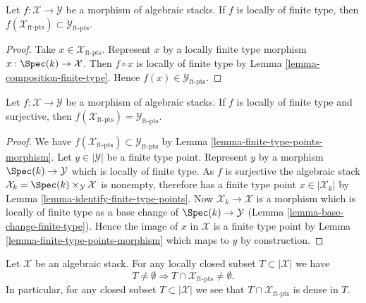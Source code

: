\begin{lemma}
\label{lemma-finite-type-points-morphism}
Let $f : \mathcal{X} \to \mathcal{Y}$ be a morphism of algebraic stacks.
If $f$ is locally of finite type, then
$f(\mathcal{X}_{\text{ft-pts}}) \subset \mathcal{Y}_{\text{ft-pts}}$.
\end{lemma}

\begin{proof}
Take $x \in \mathcal{X}_{\text{ft-pts}}$. Represent $x$ by a locally
finite type morphism $x : \Spec(k) \to \mathcal{X}$. Then
$f \circ x$ is locally of finite type by
Lemma \ref{lemma-composition-finite-type}.
Hence $f(x) \in \mathcal{Y}_{\text{ft-pts}}$.
\end{proof}

\begin{lemma}
\label{lemma-finite-type-points-surjective-morphism}
Let $f : \mathcal{X} \to \mathcal{Y}$ be a morphism of algebraic stacks.
If $f$ is locally of finite type and surjective, then
$f(\mathcal{X}_{\text{ft-pts}}) = \mathcal{Y}_{\text{ft-pts}}$.
\end{lemma}

\begin{proof}
We have $f(\mathcal{X}_{\text{ft-pts}}) \subset \mathcal{Y}_{\text{ft-pts}}$ by
Lemma \ref{lemma-finite-type-points-morphism}.
Let $y \in |\mathcal{Y}|$ be a finite type point. Represent $y$ by a morphism
$\Spec(k) \to \mathcal{Y}$ which is locally of finite type.
As $f$ is surjective the algebraic stack
$\mathcal{X}_k = \Spec(k) \times_\mathcal{Y} \mathcal{X}$ is nonempty,
therefore has a finite type point $x \in |\mathcal{X}_k|$ by
Lemma \ref{lemma-identify-finite-type-points}.
Now $\mathcal{X}_k \to \mathcal{X}$ is a morphism which is locally of finite
type as a base change of $\Spec(k) \to \mathcal{Y}$
(Lemma \ref{lemma-base-change-finite-type}).
Hence the image of $x$ in $\mathcal{X}$ is a finite type point by
Lemma \ref{lemma-finite-type-points-morphism}
which maps to $y$ by construction.
\end{proof}

\begin{lemma}
\label{lemma-enough-finite-type-points}
Let $\mathcal{X}$ be an algebraic stack.
For any locally closed subset $T \subset |\mathcal{X}|$ we have
$$
T \not = \emptyset
\Rightarrow
T \cap \mathcal{X}_{\text{ft-pts}} \not = \emptyset.
$$
In particular, for any closed subset $T \subset |\mathcal{X}|$ we
see that $T \cap \mathcal{X}_{\text{ft-pts}}$ is dense in $T$.
\end{lemma}

